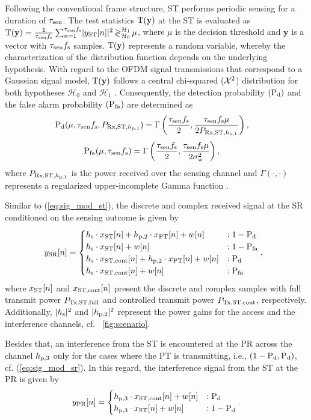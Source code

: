 Following the conventional frame structure, ST performs periodic sensing for a duration of $\tau_{\text{sen}}$. The test statistics $\operatorname*{\text{T}(\textbf{y})}$ at the ST is evaluated as $\operatorname*{\text{T}(\textbf{y})} = {\frac{1}{{\tau_{\text{sen}} f_{\text{s}}}}\sum_{n=1}^{\tau_{\text{sen}} f_{\text{s}}}} { |y_{\text{ST}}[n]|^2} \mathop{\gtrless}_{\mathcal{H}_0}^{\mathcal{H}_1} \mu$, where $\mu$ is the decision threshold and $\textbf{y}$ is a vector with $\tau_{\text{sen}} f_{\text{s}}$ samples. $\operatorname*{\text{T}(\textbf{y})}$ represents a random variable, whereby the characterization of the distribution function depends on the underlying hypothesis. With regard to the OFDM signal transmissions that correspond to a Gaussian signal model, $\operatorname*{\text{T}(\textbf{y})}$ follows a central chi-squared ($\cchi2$) distribution for both hypotheses $\mathcal H_0$ and $\mathcal H_1$ \cite{Kay}.
Consequently, the detection probability $(\text{P}_{\text{d}})$ and the false alarm probability $(\text{P}_{\text{fa}})$ are determined as \cite{Tan08}
\begin{align}
\text{P}_{\text{d}}(\mu, \tau_{\text{sen}} f_{\text{s}}, P_{\text{Rx,ST,$h_{\text{p,1}}$}}) &= \Gamma\left( \frac{\tau_{\text{sen}} f_{\text{s}}}{2}, \frac{\tau_{\text{sen}} f_{\text{s}} \mu}{2 P_{\text{Rx,ST,$h_{\text{p,1}}$}}} \right),  \label{eq:pd} 
\end{align}
\begin{align}
\text{P}_{\text{fa}}(\mu, \tau_{\text{sen}} f_{\text{s}}) &= \Gamma\left( \frac{\tau_{\text{sen}} f_{\text{s}}}{2}, \frac{\tau_{\text{sen}} f_{\text{s}} \mu}{2 \sigma^2_{\text{w}}} \right),  \label{eq:pfa} 
\end{align}
where $P_{\text{Rx,ST,$h_{\text{p,1}}$}}$ is the power received over the sensing channel and $\Gamma(\cdot, \cdot)$ represents a regularized upper-incomplete Gamma function \cite{grad}.

Similar to (\ref{eq:sig_mod_st}), the discrete and complex received signal at the SR conditioned on the sensing outcome is given by 
\begin{equation}
\hspace{-2.3mm}
\ys[n] = 
\begin{cases}
\hs \cdot \xsfull[n] + \hptw \cdot \xp[n] + w[n] &: 1 - \pd \\
\hs \cdot \xsfull[n] + w[n] &: 1 - \pfa \\
\hs \cdot \xscont[n] + \hptw \cdot \xp[n] + w[n] &: \pd \\
\hs \cdot \xscont[n] + w[n] &: \pfa 
\end{cases},
\label{eq:sig_mod_sr}
\end{equation}
where $x_{\text{ST}}[n]$ and $x_{\text{ST,cont}}[n]$ present the discrete and complex samples with full transmit power $P_{\text{Tx,ST,full}}$ and controlled transmit power $P_{\text{Tx,ST,cont}}$, respectively. Additionally, $|h_{\text{s}}|^2$ and $|h_{\text{p,2}}|^2$ represent the power gains for the access and the interference channels, cf. \figurename~\ref{fig:scenario}. 


Besides that, an interference from the ST is encountered at the PR across the channel $h_{\text{p,3}}$ only for the cases where the PT is transmitting, i.e., $(1 - \text{P}_{\text{d}}, \text{P}_{\text{d}})$, cf. (\ref{eq:sig_mod_sr}). In this regard, the interference signal from the ST at the PR is given by
\begin{equation}
y_{\text{PR}}[n] = 
\begin{cases}
h_{\text{p,3}} \cdot x_{\text{ST,cont}}[n] + w[n] & : \text{P}_{\text{d}} \\
h_{\text{p,3}} \cdot x_{\text{ST}}[n] + w[n] & : 1- \text{P}_{\text{d}} 
\end{cases}.
\label{eq:sig_mod_pr}
\end{equation}

